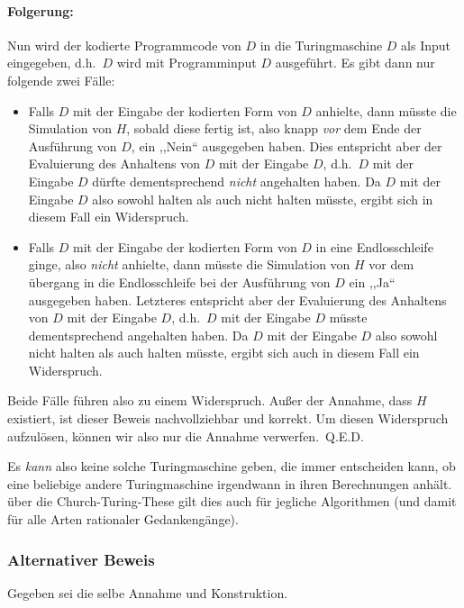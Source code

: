 \paragraph{Folgerung:}
Nun wird der kodierte Programmcode von $D$ in die Turingmaschine $D$ als Input eingegeben, d.h.\ $D$ wird mit Programminput $D$ ausgeführt. Es gibt dann nur folgende zwei Fälle:

\begin{itemize}
  \item Falls $D$ mit der Eingabe der kodierten Form von $D$ anhielte, dann müsste die Simulation von $H$, sobald diese fertig ist, also knapp \emph{vor} dem Ende der Ausführung von $D$, ein ,,Nein`` ausgegeben haben. Dies entspricht aber der Evaluierung des Anhaltens von $D$ mit der Eingabe $D$, d.h.\ $D$ mit der Eingabe $D$ dürfte dementsprechend \emph{nicht} angehalten haben. Da $D$ mit der Eingabe $D$ also sowohl halten als auch nicht halten müsste, ergibt sich in diesem Fall ein Widerspruch.
  \item Falls $D$ mit der Eingabe der kodierten Form von $D$ in eine Endlosschleife ginge, also \emph{nicht} anhielte, dann müsste die Simulation von $H$ vor dem übergang in die Endlos\-schleife bei der Ausführung von $D$ ein ,,Ja`` ausgegeben haben. Letzteres entspricht aber der Evaluierung des Anhaltens von $D$ mit der Eingabe $D$, d.h.\ $D$ mit der Eingabe $D$ müsste dementsprechend angehalten haben. Da $D$ mit der Eingabe $D$ also sowohl nicht halten als auch halten müsste, ergibt sich auch in diesem Fall ein Widerspruch.
\end{itemize}

Beide Fälle führen also zu einem Widerspruch. Außer der Annahme, dass $H$ existiert, ist dieser Beweis nachvollziehbar und korrekt. Um diesen Widerspruch aufzulösen, können wir also nur die Annahme verwerfen.~Q.E.D.

Es \emph{kann} also keine solche Turingmaschine geben, die immer entscheiden kann, ob eine beliebige andere Turingmaschine irgendwann in ihren Berechnungen anhält. über die Church-Turing-These gilt dies auch für jegliche Algorithmen (und damit für alle Arten rationaler Gedankengänge).

\subsubsection{Alternativer Beweis}
%
Gegeben sei die selbe Annahme und Konstruktion.


